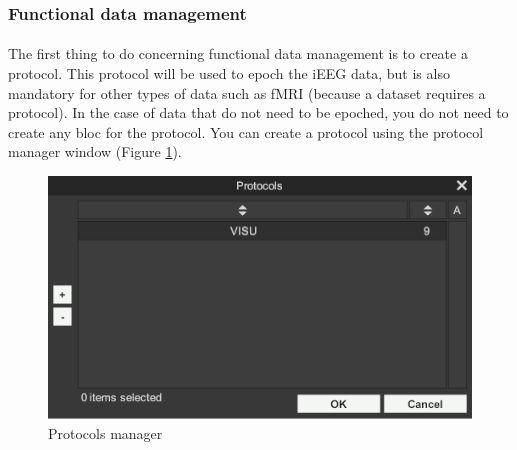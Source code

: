 \documentclass[a4paper]{article}
\begin{document}
\subsubsection{Functional data management}
\paragraph{} The first thing to do concerning functional data management is to create a protocol. This protocol will be used to epoch the iEEG data, but is also mandatory for other types of data such as fMRI (because a dataset requires a protocol). In the case of data that do not need to be epoched, you do not need to create any bloc for the protocol. You can create a protocol using the protocol manager window (Figure \ref{protocolGestionUI}).
\begin{figure}[H]
\begin{center}
\includegraphics[scale=0.5]{ProtocolGestion.png}
\end{center}
\caption{\label{protocolGestionUI}Protocols manager}
\end{figure}
\end{document}
